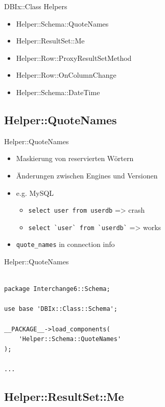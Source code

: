 
\begin{frame}{DBIx::Class Helpers}
\begin{itemize}
\item Helper::Schema::QuoteNames
\item Helper::ResultSet::Me
\item Helper::Row::ProxyResultSetMethod
\item Helper::Row::OnColumnChange
\item Helper::Schema::DateTime
\end{itemize}
\end{frame}

\subsection{Helper::QuoteNames}

\begin{frame}[fragile]{Helper::QuoteNames}
\begin{itemize}
\item Maskierung von reservierten Wörtern
\item Änderungen zwischen Engines und Versionen
\item e.g. MySQL
\begin{itemize}
\item \verb|select user from userdb| => crash
\item \verb|select `user` from `userdb`| => works
\end{itemize}
\item \verb|quote_names| in connection info
\end{itemize}
\end{frame}

\begin{frame}[fragile]{Helper::QuoteNames}
\begin{lstlisting}

package Interchange6::Schema;

use base 'DBIx::Class::Schema';

__PACKAGE__->load_components( 
    'Helper::Schema::QuoteNames' 
);

...

\end{lstlisting}
\end{frame}

\subsection{Helper::ResultSet::Me}

